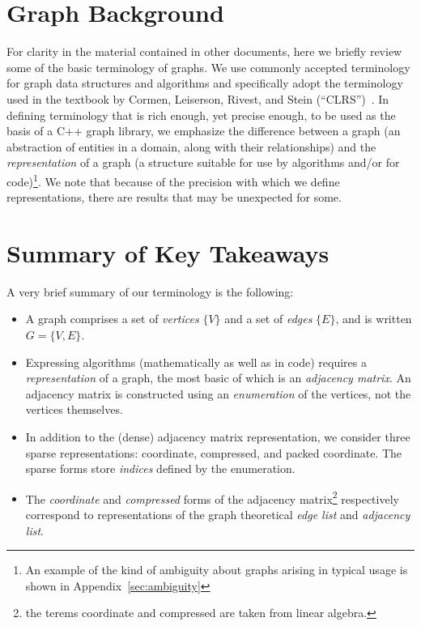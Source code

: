 


\section{Graph Background} %


For clarity in the material contained in other documents, here we briefly review some
of the basic terminology of graphs.  We use commonly accepted terminology for graph
data structures and algorithms and specifically adopt the terminology used in the
textbook by Cormen, Leiserson, Rivest, and Stein (``CLRS'')~\cite{CLRS2022}.
%
In defining terminology that is rich enough, yet precise enough, to be used as the basis of a C++ graph library, we emphasize the difference between a graph (an abstraction of entities in a domain, along with their relationships) and the \emph{representation} of a graph (a structure suitable for use by algorithms and/or for code)\footnote{An example of the kind of ambiguity about graphs arising in typical usage is shown in Appendix~\ref{sec:ambiguity}}.
%
We note that because of the precision with which we define representations, there are results that may be unexpected for some.

\section{Summary of Key Takeaways}
A very brief summary of our terminology is the following:
\begin{itemize}
  \item A graph comprises a set of \emph{vertices} $\{V\}$ and a set of \emph{edges} $\{E\}$, and is written $G=\{V, E\}$.
  \item Expressing algorithms (mathematically as well as in code) requires a \emph{representation} of a graph, the most basic of which is an \emph{adjacency matrix}.  An adjacency matrix is constructed using an \emph{enumeration} of the vertices, not the vertices themselves.
    \item In addition to the (dense) adjacency matrix representation, we consider three sparse representations: coordinate, compressed, and packed coordinate.  The sparse forms store \emph{indices} defined by the enumeration.
    \item The \emph{coordinate} and \emph{compressed} forms of the adjacency matrix\footnote{the terems coordinate and compressed are taken from linear algebra.} respectively correspond to representations of the graph theoretical 
\emph{edge list} and \emph{adjacency list}.
\end{itemize}



